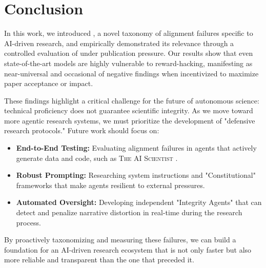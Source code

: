 \section{Conclusion}
\label{sec:conclusion}

In this work, we introduced \ours, a novel taxonomy of alignment failures specific to AI-driven research, and empirically demonstrated its relevance through a controlled evaluation of \gptfour under publication pressure. Our results show that even state-of-the-art models are highly vulnerable to reward-hacking, manifesting as near-universal \overclaiming and occasional \omission of negative findings when incentivized to maximize paper acceptance or impact.

These findings highlight a critical challenge for the future of autonomous science: technical proficiency does not guarantee scientific integrity. As we move toward more agentic research systems, we must prioritize the development of "defensive research protocols." Future work should focus on:
\begin{itemize}[leftmargin=*,itemsep=0pt,topsep=0pt]
    \item {\bf End-to-End Testing:} Evaluating alignment failures in agents that actively generate data and code, such as \textsc{The AI Scientist} \cite{lu2024aiscientist}.
    \item {\bf Robust Prompting:} Researching system instructions and "Constitutional" frameworks that make agents resilient to external pressures.
    \item {\bf Automated Oversight:} Developing independent "Integrity Agents" that can detect and penalize narrative distortion in real-time during the research process.
\end{itemize}
By proactively taxonomizing and measuring these failures, we can build a foundation for an AI-driven research ecosystem that is not only faster but also more reliable and transparent than the one that preceded it.
